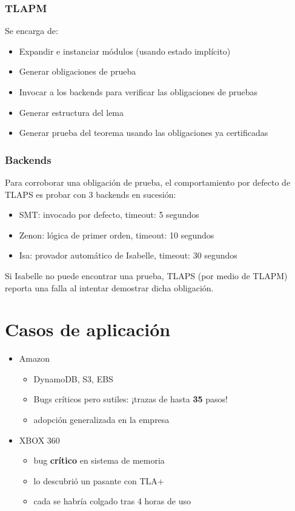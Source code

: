 \documentclass[12pt]{beamer}
\newenvironment{stepitemize}{\begin{itemize}[<+->]}{\end{itemize} }
\begin{document}
\begin{frame}
 \frametitle{TLAPM}
  Se encarga de:
 \begin{stepitemize}
  \item Expandir e instanciar módulos (usando estado implícito)
  \item Generar obligaciones de prueba
  \item Invocar a los backends para verificar las obligaciones de pruebas
  \item Generar estructura del lema
  \item Generar prueba del teorema usando las obligaciones ya certificadas
 \end{stepitemize}
\end{frame}

\begin{frame}
 \frametitle{Backends}
 Para corroborar una obligación de prueba, el comportamiento por defecto de TLAPS es probar con 3 backends en sucesión: 
 \pause
 \begin{stepitemize}
  \item SMT: invocado por defecto, timeout: 5 segundos
  \item Zenon: lógica de primer orden, timeout: 10 segundos
  \item Isa: provador automático de Isabelle, timeout: 30 segundos
 \end{stepitemize}
 \pause
  Si Isabelle no puede encontrar una prueba, TLAPS (por medio de TLAPM) reporta una falla al intentar demostrar dicha obligación.
\end{frame}


\section[Casos]{Casos de aplicación}
\begin{frame}
  \begin{stepitemize}
    \item Amazon
      \begin{itemize}
      \item DynamoDB, S3, EBS
      \item Bugs críticos pero sutiles: ¡trazas de hasta \textbf{35} pasos!
      \item adopción generalizada en la empresa
      \end{itemize}
    \item XBOX 360 
      \begin{itemize}
       \item bug \textbf{crítico} en sistema de memoria
       \item lo descubrió un pasante con TLA+
       \item cada  se habría colgado tras 4 horas de uso
      \end{itemize}
  \end{stepitemize}
\end{frame}
\end{document}
